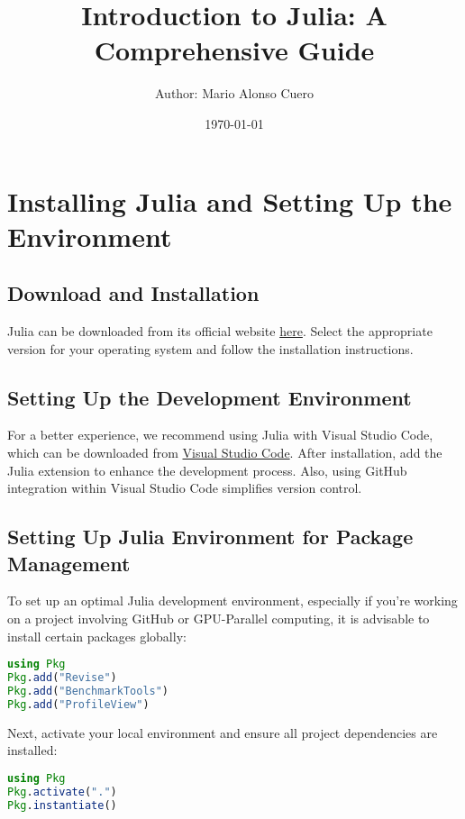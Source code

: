\documentclass[a4paper,12pt]{article}
\title{Introduction to Julia: A Comprehensive Guide}
\author{Author: Mario Alonso Cuero}
\date{\today}
\begin{document}
\maketitle

\tableofcontents

\newpage

\section{Installing Julia and Setting Up the Environment}

\subsection{Download and Installation}
Julia can be downloaded from its official website \href{https://julialang.org/downloads/}{here}. Select the appropriate version for your operating system and follow the installation instructions.

\subsection{Setting Up the Development Environment}
For a better experience, we recommend using Julia with Visual Studio Code, which can be downloaded from \href{https://code.visualstudio.com/}{Visual Studio Code}. After installation, add the Julia extension to enhance the development process. Also, using GitHub integration within Visual Studio Code simplifies version control.

\subsection{Setting Up Julia Environment for Package Management}
To set up an optimal Julia development environment, especially if you're working on a project involving GitHub or GPU-Parallel computing, it is advisable to install certain packages globally:

\begin{lstlisting}[language=Julia]
using Pkg
Pkg.add("Revise")
Pkg.add("BenchmarkTools")
Pkg.add("ProfileView")
\end{lstlisting}

Next, activate your local environment and ensure all project dependencies are installed:

\begin{lstlisting}[language=Julia]
using Pkg
Pkg.activate(".")
Pkg.instantiate()
\end{lstlisting}
\end{document}
